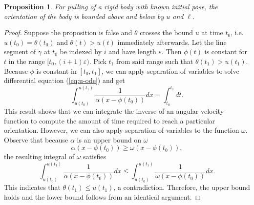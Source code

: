 \documentclass[conference]{IEEEtran}
\newtheorem{proposition}{Proposition}
\begin{document}
\begin{proposition}
  For pulling of a rigid body with known initial pose, the orientation
  of the body is bounded above and below by $u$ and $\ell$.
\end{proposition}

\begin{proof}
  Suppose the proposition is false and $\theta$ crosses the bound $u$
  at time $t_0$, i.e. $u(t_0)=\theta(t_0)$ and $\theta(t) > u(t)$
  immediately afterwards. Let the line segment of $\gamma$ at $t_0$ be
  indexed by $i$ and have length $\varepsilon$. Then $\phi(t)$ is
  constant for $t$ in the range $[t_0,(i+1)\varepsilon)$. Pick $t_1$
  from said range such that $\theta(t_1) > u(t_1)$. Because $\phi$ is
  constant in $[t_0,t_1]$, we can apply separation of variables to
  solve differential equation (\ref{eq:u-ode}) and get
  \begin{equation}
    \int_{u(t_0)}^{u(t_1)}\frac{1}{\alpha(x - \phi(t_0))}dx = \int_{t_0}^{t_1}dt.
  \end{equation}
  This result shows that we can integrate the inverse of an angular
  velocity function to compute the amount of time required to reach a
  particular orientation. However, we can also apply separation of
  variables to the function $\omega$. Observe that because $\alpha$ is
  an upper bound on $\omega$
  \begin{equation} 
    \alpha(x - \phi(t_0)) \geq \omega(x - \phi(t_0)),
  \end{equation}
  the resulting integral of $\omega$ satisfies
  \begin{equation}
    \int_{u(t_0)}^{u(t_1)}\frac{1}{\alpha(x - \phi(t_0))}dx \leq \int_{u(t_0)}^{u(t_1)}\frac{1}{\omega(x - \phi(t_0))}dx.
  \end{equation}
  This indicates that $\theta(t_1) \leq u(t_1)$, a
  contradiction. Therefore, the upper bound holds and the lower bound
  follows from an identical argument.
\end{proof}

\end{document}
